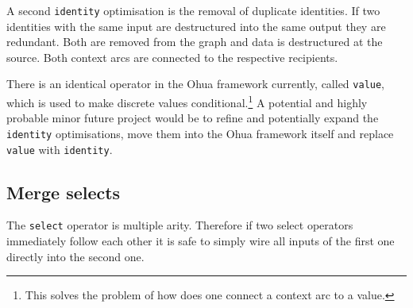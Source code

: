 A second \texttt{identity} optimisation is the removal of duplicate identities.
If two identities with the same input are destructured into the same output they are redundant.
Both are removed from the graph and data is destructured at the source.
Both context arcs are connected to the respective recipients.

There is an identical operator in the Ohua framework currently, called \texttt{value}, which is used to make discrete values conditional.\footnote{This solves the problem of how does one connect a context arc to a value.}
A potential and highly probable minor future project would be to refine and potentially expand the \texttt{identity} optimisations, move them into the Ohua framework itself and replace \texttt{value} with \texttt{identity}.

\subsection{Merge selects}

The \texttt{select} operator is multiple arity.
Therefore if two select operators immediately follow each other it is safe to simply wire all inputs of the first one directly into the second one.
